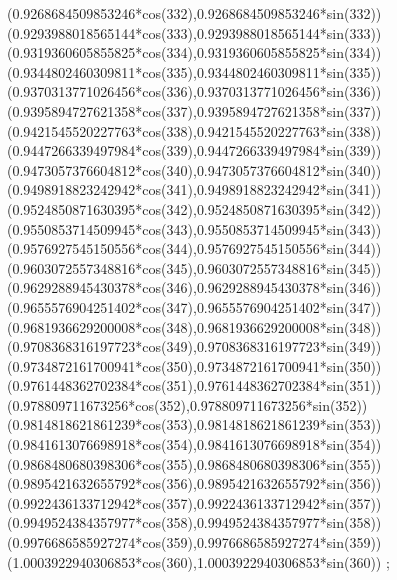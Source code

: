 {({0.9268684509853246*cos(332)},{0.9268684509853246*sin(332)})
({0.9293988018565144*cos(333)},{0.9293988018565144*sin(333)})
({0.9319360605855825*cos(334)},{0.9319360605855825*sin(334)})
({0.9344802460309811*cos(335)},{0.9344802460309811*sin(335)})
({0.9370313771026456*cos(336)},{0.9370313771026456*sin(336)})
({0.9395894727621358*cos(337)},{0.9395894727621358*sin(337)})
({0.9421545520227763*cos(338)},{0.9421545520227763*sin(338)})
({0.9447266339497984*cos(339)},{0.9447266339497984*sin(339)})
({0.9473057376604812*cos(340)},{0.9473057376604812*sin(340)})
({0.9498918823242942*cos(341)},{0.9498918823242942*sin(341)})
({0.9524850871630395*cos(342)},{0.9524850871630395*sin(342)})
({0.9550853714509945*cos(343)},{0.9550853714509945*sin(343)})
({0.9576927545150556*cos(344)},{0.9576927545150556*sin(344)})
({0.9603072557348816*cos(345)},{0.9603072557348816*sin(345)})
({0.9629288945430378*cos(346)},{0.9629288945430378*sin(346)})
({0.9655576904251402*cos(347)},{0.9655576904251402*sin(347)})
({0.9681936629200008*cos(348)},{0.9681936629200008*sin(348)})
({0.9708368316197723*cos(349)},{0.9708368316197723*sin(349)})
({0.9734872161700941*cos(350)},{0.9734872161700941*sin(350)})
({0.9761448362702384*cos(351)},{0.9761448362702384*sin(351)})
({0.978809711673256*cos(352)},{0.978809711673256*sin(352)})
({0.9814818621861239*cos(353)},{0.9814818621861239*sin(353)})
({0.9841613076698918*cos(354)},{0.9841613076698918*sin(354)})
({0.9868480680398306*cos(355)},{0.9868480680398306*sin(355)})
({0.9895421632655792*cos(356)},{0.9895421632655792*sin(356)})
({0.9922436133712942*cos(357)},{0.9922436133712942*sin(357)})
({0.9949524384357977*cos(358)},{0.9949524384357977*sin(358)})
({0.9976686585927274*cos(359)},{0.9976686585927274*sin(359)})
({1.0003922940306853*cos(360)},{1.0003922940306853*sin(360)})
};
